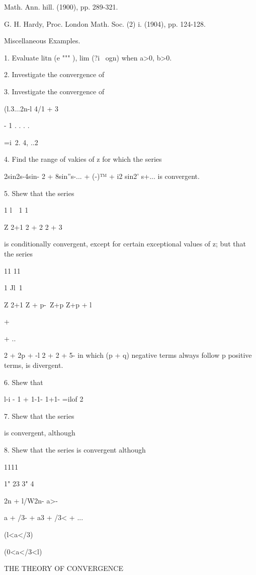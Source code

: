     Math. Ann. hill. (1900), pp. 289-321.

G. H. Hardy, Proc. London Math. Soc. (2) i. (1904), pp. 124-128.

Miscellaneous Examples.

1. Evaluate litn (e """ ), lim (?i~ ogn) when a>0, b>0.

2. Investigate the convergence of

3. Investigate the convergence of

(l.3...2n-l 4/1 + 3


- 1 . . . . 

 =i\ 2. 4, ..2%

4. Find the range of vakies of z for which the series

2sin2s-4sin- 2 + 8sin''s-... + (-)™ + i2 sin2' s+... is convergent.

5. Shew that the series

1 l\ \ 1 1\

Z 2+1 2 + 2 2 + 3

is conditionally convergent, except for certain exceptional values of
z; but that the series

11 11

1 Jl\ 1

Z 2+1 Z + p-\ Z+p Z+p + l

+

+ ..

2 + 2p + -l 2 + 2 + 5- in which (p + q) negative terms always follow p
positive terms, is divergent. 

6. Shew that

l-i - 1 + 1-1- 1+1- =ilof 2

7. Shew that the series

is convergent, although

8. Shew that the series is convergent although

1111

1" 23 3" 4

 2n + l/W2n- a>-

a + /3- + a3 + /3< + ...

 (l<a</3)


(0<a</3<l)


THE THEORY OF CONVERGENCE

